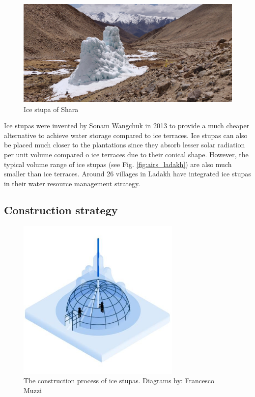 \begin{figure}[htb]
\centering
\includegraphics[width=12cm]{figs/IS_example.jpg}

\caption{Ice stupa of Shara}

\label{fig:ISexample}
\end{figure}

Ice stupas were invented by Sonam Wangchuk in 2013 \cite{wangchukIceStupaArtificial2014} to provide a much
cheaper alternative to achieve water storage compared to ice terraces. Ice stupas can also be placed much closer
to the plantations since they absorb lesser solar radiation per unit volume compared o ice terraces due to their
conical shape. However, the typical volume range of ice stupas (see Fig. \ref{fig:airs_ladakh}) are also much
smaller than ice terraces. Around 26 villages in Ladakh \cite{wangchukIceStupaCompetition2020} have integrated
ice stupas in their water resource management strategy.

\subsection{Construction strategy}

\begin{figure}[htb]
\centering
\includegraphics[width=8cm]{figs/IS_science.jpg}

\caption{The construction process of ice stupas. Diagrams by: Francesco Muzzi }

\label{fig:ISconstruction}
\end{figure}

